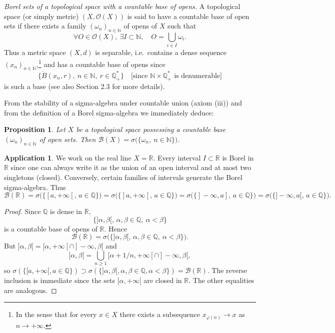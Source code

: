 \documentclass[11pt]{article}
\newtheorem{proposition}{Proposition}[section]
\theoremstyle{definition}
\newtheorem{application}{Application}[section]
\begin{document}
\medskip\noindent
\textit{Borel sets of a topological space with a countable base of opens.}
A topological space (or simply metric) $(X,\mathcal O(X))$ is said to have a countable base of open sets if there exists a family $(\omega_n)_{n\in\mathbb N}$ of opens of $X$ such that
\[
\forall O\in\mathcal O(X),\ \exists I\subset\mathbb N,\quad O=\bigcup_{i\in I}\omega_i .
\]
Thus a metric space $(X,d)$ is separable, i.e.\ contains a dense sequence $(x_n)_{n\in\mathbb N}$,\footnote{In the sense that for every $x\in X$ there exists a subsequence $x_{\varphi(n)}\to x$ as $n\to +\infty$.}
and has a countable base of opens since
\[
\bigl\{\mathring B(x_n,r),\ n\in\mathbb N,\ r\in\mathbb Q^{\ast}_+\bigr\}\quad\text{[since $\mathbb N\times\mathbb Q^{\ast}_+$ is denumerable]}
\]
is such a base (see also Section 2.3 for more details).

From the stability of a sigma-algebra under countable union (axiom (iii)) and from the definition of a Borel sigma-algebra we immediately deduce:

\begin{proposition}
Let $X$ be a topological space possessing a countable base $(\omega_n)_{n\in\mathbb N}$ of open sets. Then $\mathcal B(X)=\sigma\bigl(\{\omega_n,\ n\in\mathbb N\}\bigr)$.
\end{proposition}

\begin{application}
We work on the real line $X=\mathbb R$. Every interval $I\subset\mathbb R$ is Borel in $\mathbb R$ since one can always write it as the union of an open interval and at most two singletons (closed). Conversely, certain families of intervals generate the Borel sigma-algebra. Thus
\[
\mathcal B(\mathbb R)
= \sigma\bigl(\{[a,+\infty[,\, a\in\mathbb Q\}\bigr)
= \sigma\bigl(\{]a,+\infty[,\, a\in\mathbb Q\}\bigr)
= \sigma\bigl(\{]-\infty,a],\, a\in\mathbb Q\}\bigr)
= \sigma\bigl(\{]-\infty,a[,\, a\in\mathbb Q\}\bigr).
\]

\end{application}

\begin{proof}

Since $\mathbb Q$ is dense in $\mathbb R$,
\[
\{] \alpha,\beta[,\, \alpha,\beta\in\mathbb Q,\ \alpha<\beta\}
\]
is a countable base of opens of $\mathbb R$. Hence
\[
\mathcal B(\mathbb R)=\sigma\bigl(\{] \alpha,\beta[,\, \alpha,\beta\in\mathbb Q,\ \alpha<\beta\}\bigr).
\]
But $] \alpha,\beta[ = [\alpha,+\infty[ \cap ]-\infty,\beta[$ and
\[
] \alpha,\beta[=\bigcup_{n\ge1} [\alpha+1/n,+\infty[ \cap ]-\infty,\beta[,
\]
so $\sigma(\{[a,+\infty[, a\in\mathbb Q\})\supset \sigma(\{] \alpha,\beta[, \alpha,\beta\in\mathbb Q,\alpha<\beta\})=\mathcal B(\mathbb R)$. The reverse inclusion is immediate since the sets $[\alpha,+\infty[$ are closed in $\mathbb R$. The other equalities are analogous.

\end{proof}
\end{document}
